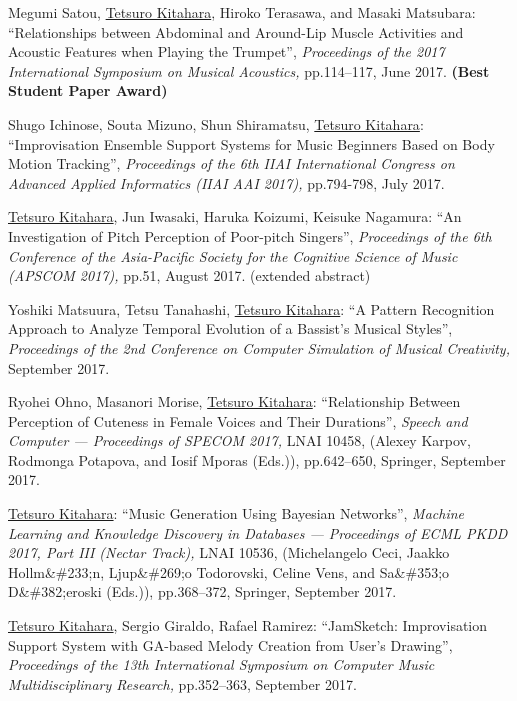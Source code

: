 \begin{Enumerate}
\item 
Megumi Satou, 
\underline{Tetsuro Kitahara}, 
Hiroko Terasawa, 
and 
Masaki Matsubara: 
    ``Relationships between Abdominal and Around-Lip Muscle Activities
and Acoustic Features when Playing the Trumpet'', 
    {\it Proceedings of the 2017 International Symposium on Musical Acoustics,
    } pp.114--117, June 2017. 
{\bf (Best Student Paper Award)}
\item 
Shugo Ichinose, 
Souta Mizuno, 
Shun Shiramatsu, 
\underline{Tetsuro Kitahara}: 
    ``Improvisation Ensemble Support Systems for Music Beginners Based on Body Motion Tracking'', 
    {\it Proceedings of the 6th IIAI International Congress on Advanced Applied Informatics (IIAI AAI 2017),
    } pp.794-798, July 2017. 

\item 
\underline{Tetsuro Kitahara}, 
Jun Iwasaki, 
Haruka Koizumi, 
Keisuke Nagamura: 
    ``An Investigation of Pitch Perception of Poor-pitch Singers'', 
    {\it Proceedings of the 6th Conference of the Asia-Pacific Society for the Cognitive Science of Music (APSCOM 2017),
    } pp.51, August 2017. 
(extended abstract)
\item 
Yoshiki Matsuura, 
Tetsu Tanahashi, 
\underline{Tetsuro Kitahara}: 
    ``A Pattern Recognition Approach to Analyze Temporal Evolution of a Bassist’s Musical Styles'', 
    {\it Proceedings of the 2nd Conference on Computer Simulation of Musical Creativity,
    } September 2017. 

\item 
Ryohei Ohno, 
Masanori Morise, 
\underline{Tetsuro Kitahara}: 
    ``Relationship Between Perception of Cuteness in Female Voices and Their Durations'', 
    {\it Speech and Computer --- Proceedings of SPECOM 2017,
    } LNAI 10458, (Alexey Karpov, Rodmonga Potapova, and Iosif Mporas (Eds.)), pp.642--650, Springer, September 2017. 

\item 
\underline{Tetsuro Kitahara}: 
    ``Music Generation Using Bayesian Networks'', 
    {\it Machine Learning and Knowledge Discovery in Databases --- Proceedings of ECML PKDD 2017, Part III (Nectar Track),
    } LNAI 10536, (Michelangelo Ceci, Jaakko Hollm\&\#233;n, Ljup\&\#269;o Todorovski, Celine Vens, and Sa\&\#353;o D\&\#382;eroski (Eds.)), pp.368--372, Springer, September 2017. 

\item 
\underline{Tetsuro Kitahara}, 
Sergio Giraldo, 
Rafael Ramirez: 
    ``JamSketch: Improvisation Support System with GA-based Melody Creation from User’s Drawing'', 
    {\it Proceedings of the 13th International Symposium on Computer Music Multidisciplinary Research,
    } pp.352--363, September 2017. 


\end{Enumerate}
